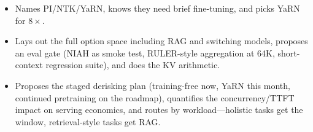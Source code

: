 \begin{interviewq}
\goodgreat
\begin{itemize}
    \item {} Names PI/NTK/YaRN, knows they need brief fine-tuning, and picks YaRN for $8\times$.
    \item {} Lays out the full option space including RAG and switching models, proposes an eval gate (NIAH as smoke test, RULER-style aggregation at 64K, short-context regression suite), and does the KV arithmetic.
    \item {} Proposes the staged derisking plan (training-free now, YaRN this month, continued pretraining on the roadmap), quantifies the concurrency/TTFT impact on serving economics, and routes by workload---holistic tasks get the window, retrieval-style tasks get RAG.
\end{itemize}

\end{interviewq}


